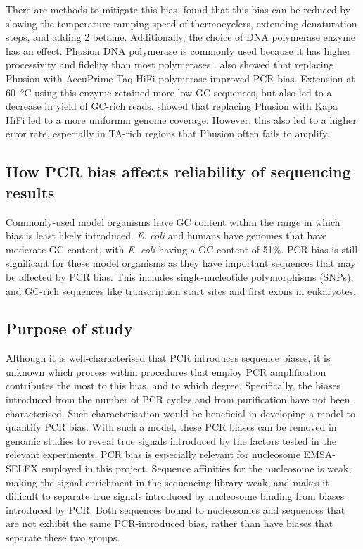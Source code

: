 \documentclass[parskip=full, numbers=noenddot]{scrreprt}
\begin{document}
There are methods to mitigate this bias.  \citet{aird_analyzing_2011} found that this bias can be reduced by slowing the temperature ramping speed of thermocyclers, extending denaturation steps, and adding \SI{2}{\Molar} betaine.  Additionally, the choice of DNA polymerase enzyme has an effect.  Phusion DNA polymerase is commonly used because it has higher processivity and fidelity than most polymerases \citep{quail_optimal_2012}.  \citet{aird_analyzing_2011} also showed that replacing Phusion with AccuPrime Taq HiFi polymerase improved PCR bias.  Extension at \SI{60}{\celsius} using this enzyme retained more low-GC sequences, but also led to a decrease in yield of GC-rich reads.  \citet{quail_optimal_2012} showed that replacing Phusion with Kapa HiFi led to a more uniformm genome coverage.  However, this also led to a higher error rate, especially in TA-rich regions that Phusion often fails to amplify.

\subsection{How PCR bias affects reliability of sequencing results}
\label{ssec:pcrbias_intro_effects}

Commonly-used model organisms have GC content within the range in which bias is least likely introduced.  \emph{E. coli} and humans have genomes that have moderate GC content, with \emph{E. coli} having a GC content of 51\%.  PCR bias is still significant for these model organisms as they have important sequences that may be affected by PCR bias.  This includes single-nucleotide polymorphisms (SNPs), and GC-rich sequences like transcription start sites and first exons in eukaryotes.  %

\subsection{Purpose of study}
\label{ssec:pcrbias_intro_why}

Although it is well-characterised that PCR introduces sequence biases, it is unknown which process within procedures that employ PCR amplification contributes the most to this bias, and to which degree.  Specifically, the biases introduced from the number of PCR cycles and from purification have not been characterised.  Such characterisation would be beneficial in developing a model to quantify PCR bias.  With such a model, these PCR biases can be removed in genomic studies to reveal true signals introduced by the factors tested in the relevant experiments.  PCR bias is especially relevant for nucleosome EMSA-SELEX employed in this project.  Sequence affinities for the nucleosome is weak, making the signal enrichment in the sequencing library weak, and makes it difficult to separate true signals introduced by nucleosome binding from biases introduced by PCR.  Both sequences bound to nucleosomes and sequences that are not exhibit the same PCR-introduced bias, rather than have biases that separate these two groups.
\end{document}
